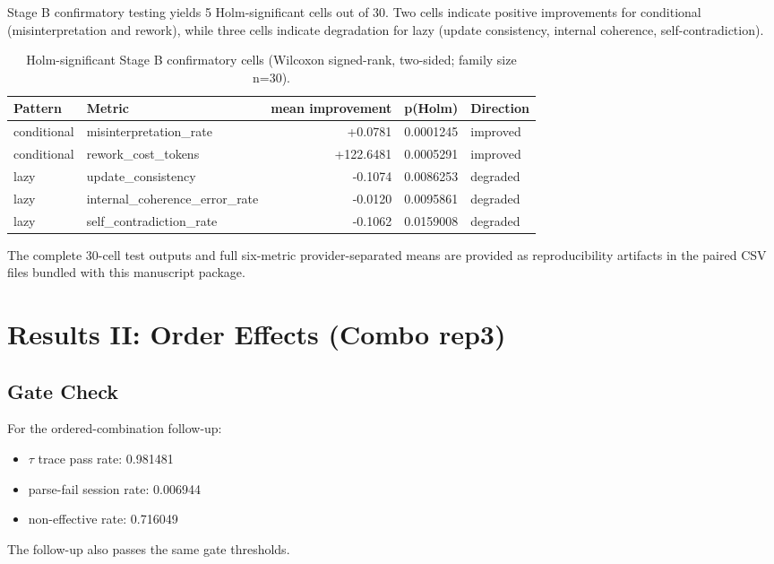 \documentclass[11pt,a4paper]{article}
\begin{document}
Stage B confirmatory testing yields 5 Holm-significant cells out of 30. Two cells indicate positive improvements for conditional (misinterpretation and rework), while three cells indicate degradation for lazy (update consistency, internal coherence, self-contradiction).

\begin{table}[h]
\centering
\small
\begin{tabular}{llrrl}
\toprule
Pattern & Metric & mean improvement & p(Holm) & Direction \\
\midrule
conditional & misinterpretation\_rate & +0.0781 & 0.0001245 & improved \\
conditional & rework\_cost\_tokens & +122.6481 & 0.0005291 & improved \\
lazy & update\_consistency & -0.1074 & 0.0086253 & degraded \\
lazy & internal\_coherence\_error\_rate & -0.0120 & 0.0095861 & degraded \\
lazy & self\_contradiction\_rate & -0.1062 & 0.0159008 & degraded \\
\bottomrule
\end{tabular}
\caption{Holm-significant Stage B confirmatory cells (Wilcoxon signed-rank, two-sided; family size n=30).}
\label{tab:stageb_holm_sig}
\end{table}

The complete 30-cell test outputs and full six-metric provider-separated means are provided as reproducibility artifacts in the paired CSV files bundled with this manuscript package.

\section{Results II: Order Effects (Combo rep3)}
\label{sec:results_combo}

\subsection{Gate Check}

For the ordered-combination follow-up:
\begin{itemize}
  \item $\tau$ trace pass rate: 0.981481
  \item parse-fail session rate: 0.006944
  \item non-effective rate: 0.716049
\end{itemize}

The follow-up also passes the same gate thresholds.
\end{document}
